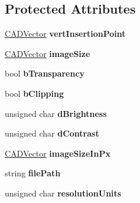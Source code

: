 \subsection*{Protected Attributes}
\begin{DoxyCompactItemize}
\item 
\hyperlink{class_c_a_d_vector}{C\+A\+D\+Vector} {\bfseries vert\+Insertion\+Point}\hypertarget{class_c_a_d_image_a8829a273086dadedda0719d8d83a4904}{}\label{class_c_a_d_image_a8829a273086dadedda0719d8d83a4904}

\item 
\hyperlink{class_c_a_d_vector}{C\+A\+D\+Vector} {\bfseries image\+Size}\hypertarget{class_c_a_d_image_a87c6eb73a7b81fe28c8df3203553e547}{}\label{class_c_a_d_image_a87c6eb73a7b81fe28c8df3203553e547}

\item 
bool {\bfseries b\+Transparency}\hypertarget{class_c_a_d_image_a209d0125f3d725be201df93852a46e17}{}\label{class_c_a_d_image_a209d0125f3d725be201df93852a46e17}

\item 
bool {\bfseries b\+Clipping}\hypertarget{class_c_a_d_image_a44ba67554699da20f767f13b6a3a6214}{}\label{class_c_a_d_image_a44ba67554699da20f767f13b6a3a6214}

\item 
unsigned char {\bfseries d\+Brightness}\hypertarget{class_c_a_d_image_aee4ce055b1e5341c6da019485aa4c6e1}{}\label{class_c_a_d_image_aee4ce055b1e5341c6da019485aa4c6e1}

\item 
unsigned char {\bfseries d\+Contrast}\hypertarget{class_c_a_d_image_a78d8f337b278072db1c3c290bea6096c}{}\label{class_c_a_d_image_a78d8f337b278072db1c3c290bea6096c}

\item 
\hyperlink{class_c_a_d_vector}{C\+A\+D\+Vector} {\bfseries image\+Size\+In\+Px}\hypertarget{class_c_a_d_image_ad9b830757e767e508945a60b12d5269a}{}\label{class_c_a_d_image_ad9b830757e767e508945a60b12d5269a}

\item 
string {\bfseries file\+Path}\hypertarget{class_c_a_d_image_ad88a985c9f856e4c569c32e6a47e4ac6}{}\label{class_c_a_d_image_ad88a985c9f856e4c569c32e6a47e4ac6}

\item 
unsigned char {\bfseries resolution\+Units}\hypertarget{class_c_a_d_image_aac598b7bc4642ec14b5d20befb8108e7}{}\label{class_c_a_d_image_aac598b7bc4642ec14b5d20befb8108e7}


\end{DoxyCompactItemize}
